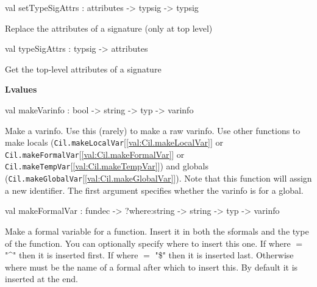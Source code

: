 \documentclass[11pt]{article}
\begin{document}
\label{val:Cil.setTypeSigAttrs}\begin{ocamldoccode}
val setTypeSigAttrs : attributes -> typsig -> typsig
\end{ocamldoccode}
\begin{ocamldocdescription}
Replace the attributes of a signature (only at top level)


\end{ocamldocdescription}




\label{val:Cil.typeSigAttrs}\begin{ocamldoccode}
val typeSigAttrs : typsig -> attributes
\end{ocamldoccode}
\begin{ocamldocdescription}
Get the top-level attributes of a signature


\end{ocamldocdescription}




{\bf Lvalues}



\label{val:Cil.makeVarinfo}\begin{ocamldoccode}
val makeVarinfo : bool -> string -> typ -> varinfo
\end{ocamldoccode}
\begin{ocamldocdescription}
Make a varinfo. Use this (rarely) to make a raw varinfo. Use other 
 functions to make locals ({\tt{Cil.makeLocalVar}}[\ref{val:Cil.makeLocalVar}] or {\tt{Cil.makeFormalVar}}[\ref{val:Cil.makeFormalVar}] or 
 {\tt{Cil.makeTempVar}}[\ref{val:Cil.makeTempVar}]) and globals ({\tt{Cil.makeGlobalVar}}[\ref{val:Cil.makeGlobalVar}]). Note that this 
 function will assign a new identifier. The first argument specifies 
 whether the varinfo is for a global.


\end{ocamldocdescription}




\label{val:Cil.makeFormalVar}\begin{ocamldoccode}
val makeFormalVar : fundec -> ?where:string -> string -> typ -> varinfo
\end{ocamldoccode}
\begin{ocamldocdescription}
Make a formal variable for a function. Insert it in both the sformals 
    and the type of the function. You can optionally specify where to insert 
    this one. If where $=$ "\textasciicircum " then it is inserted first. If where $=$ "\$" then 
    it is inserted last. Otherwise where must be the name of a formal after 
    which to insert this. By default it is inserted at the end.


\end{ocamldocdescription}
\end{document}
